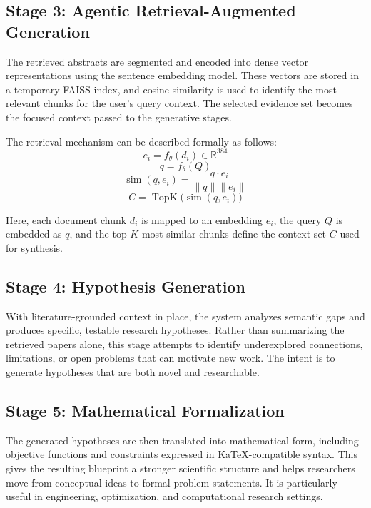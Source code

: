 \documentclass[conference]{IEEEtran}
\begin{document}
\subsection{Stage 3: Agentic Retrieval-Augmented Generation}
The retrieved abstracts are segmented and encoded into dense vector representations using the sentence embedding model. These vectors are stored in a temporary FAISS index, and cosine similarity is used to identify the most relevant chunks for the user's query context. The selected evidence set becomes the focused context passed to the generative stages.

The retrieval mechanism can be described formally as follows:
\begin{equation}
e_i = f_{\theta}(d_i) \in \mathbb{R}^{384}
\label{eq:embedding}
\end{equation}
\begin{equation}
q = f_{\theta}(Q)
\label{eq:query}
\end{equation}
\begin{equation}
\operatorname{sim}(q, e_i) = \frac{q \cdot e_i}{\lVert q \rVert \lVert e_i \rVert}
\label{eq:cosine}
\end{equation}
\begin{equation}
C = \operatorname{TopK}\big(\operatorname{sim}(q, e_i)\big)
\label{eq:topk}
\end{equation}

Here, each document chunk $d_i$ is mapped to an embedding $e_i$, the query $Q$ is embedded as $q$, and the top-$K$ most similar chunks define the context set $C$ used for synthesis.

\subsection{Stage 4: Hypothesis Generation}
With literature-grounded context in place, the system analyzes semantic gaps and produces specific, testable research hypotheses. Rather than summarizing the retrieved papers alone, this stage attempts to identify underexplored connections, limitations, or open problems that can motivate new work. The intent is to generate hypotheses that are both novel and researchable.

\subsection{Stage 5: Mathematical Formalization}
The generated hypotheses are then translated into mathematical form, including objective functions and constraints expressed in KaTeX-compatible syntax. This gives the resulting blueprint a stronger scientific structure and helps researchers move from conceptual ideas to formal problem statements. It is particularly useful in engineering, optimization, and computational research settings.
\end{document}

